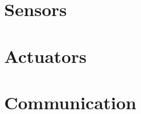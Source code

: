 \section{Sensors}
\label{sec:sensor}

\section{Actuators}
\label{sec:actuators}

\section{Communication}
\label{sec:communication}